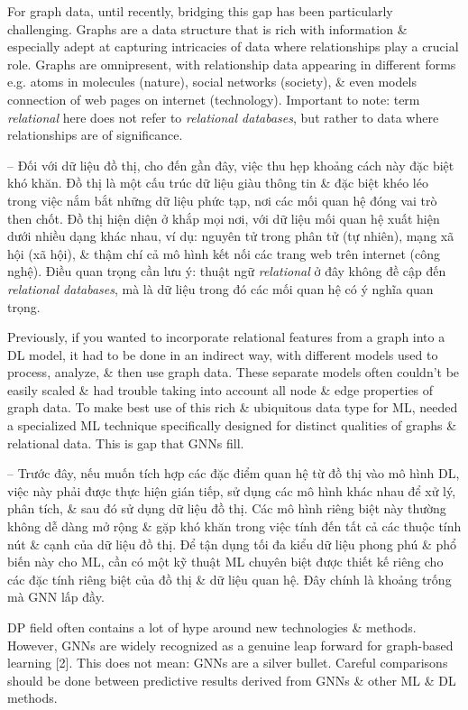 \documentclass{article}
\begin{document}
\begin{itemize}
    For graph data, until recently, bridging this gap has been particularly challenging. Graphs are a data structure that is rich with information \& especially adept at capturing intricacies of data where relationships play a crucial role. Graphs are omnipresent, with relationship data appearing in different forms e.g. atoms in molecules (nature), social networks (society), \& even models connection of web pages on internet (technology). Important to note: term {\it relational} here does not refer to {\it relational databases}, but rather to data where relationships are of significance.

    -- Đối với dữ liệu đồ thị, cho đến gần đây, việc thu hẹp khoảng cách này đặc biệt khó khăn. Đồ thị là một cấu trúc dữ liệu giàu thông tin \& đặc biệt khéo léo trong việc nắm bắt những dữ liệu phức tạp, nơi các mối quan hệ đóng vai trò then chốt. Đồ thị hiện diện ở khắp mọi nơi, với dữ liệu mối quan hệ xuất hiện dưới nhiều dạng khác nhau, ví dụ: nguyên tử trong phân tử (tự nhiên), mạng xã hội (xã hội), \& thậm chí cả mô hình kết nối các trang web trên internet (công nghệ). Điều quan trọng cần lưu ý: thuật ngữ {\it relational} ở đây không đề cập đến {\it relational databases}, mà là dữ liệu trong đó các mối quan hệ có ý nghĩa quan trọng.

    Previously, if you wanted to incorporate relational features from a graph into a DL model, it had to be done in an indirect way, with different models used to process, analyze, \& then use graph data. These separate models often couldn't be easily scaled \& had trouble taking into account all node \& edge properties of graph data. To make best use of this rich \& ubiquitous data type for ML, needed a specialized ML technique specifically designed for distinct qualities of graphs \& relational data. This is gap that GNNs fill.

    -- Trước đây, nếu muốn tích hợp các đặc điểm quan hệ từ đồ thị vào mô hình DL, việc này phải được thực hiện gián tiếp, sử dụng các mô hình khác nhau để xử lý, phân tích, \& sau đó sử dụng dữ liệu đồ thị. Các mô hình riêng biệt này thường không dễ dàng mở rộng \& gặp khó khăn trong việc tính đến tất cả các thuộc tính nút \& cạnh của dữ liệu đồ thị. Để tận dụng tối đa kiểu dữ liệu phong phú \& phổ biến này cho ML, cần có một kỹ thuật ML chuyên biệt được thiết kế riêng cho các đặc tính riêng biệt của đồ thị \& dữ liệu quan hệ. Đây chính là khoảng trống mà GNN lấp đầy.

    DP field often contains a lot of hype around new technologies \& methods. However, GNNs are widely recognized as a genuine leap forward for graph-based learning [2]. This does not mean: GNNs are a silver bullet. Careful comparisons should be done between predictive results derived from GNNs \& other ML \& DL methods.


\end{itemize}
\end{document}
